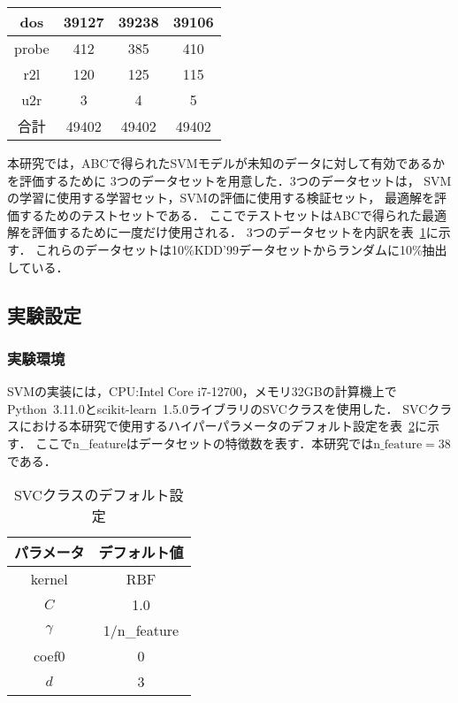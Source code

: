 \begin{table}[tb]
\begin{minipage}{0.45\textwidth}
\begin{tabular}{|c|c|c|c|}
          \hline  %
          dos & 39127 & 39238 & 39106 \\  %
          \hline  %
          probe & 412 & 385 & 410 \\  %
          \hline  %
          r2l & 120 & 125 & 115 \\  %
          \hline  %
          u2r & 3 & 4 & 5 \\  %
          \hline  %
          合計 & 49402 & 49402 & 49402 \\  %
          \hline  %
        \end{tabular}
        \label{3kdd99}  %
    \end{minipage}
  \end{table}
本研究では，ABCで得られたSVMモデルが未知のデータに対して有効であるかを評価するために
3つのデータセットを用意した\cite{origin}．3つのデータセットは，
SVMの学習に使用する学習セット，SVMの評価に使用する検証セット，
最適解を評価するためのテストセットである．
ここでテストセットはABCで得られた最適解を評価するために一度だけ使用される．
3つのデータセットを内訳を表~\ref{3kdd99}に示す．
これらのデータセットは10\%KDD'99データセットからランダムに10\%抽出している．
\subsection{実験設定}
\subsubsection{実験環境}
SVMの実装には，CPU:Intel Core i7-12700，メモリ32GBの計算機上で
Python~3.11.0とscikit-learn~1.5.0ライブラリのSVCクラスを使用した．
SVCクラスにおける本研究で使用するハイパーパラメータのデフォルト設定を表~\ref{default}に示す．
ここでn\_featureはデータセットの特徴数を表す．本研究では$\text{n\_feature}=38$である．
\begin{table}[tb]
    \centering
    \caption{SVCクラスのデフォルト設定}
    \begin{tabular}{|c|c|}  %
      \hline  %
      パラメータ & デフォルト値 \\  %
      \hline  %
      kernel & RBF\\  %
      \hline  %
      $C$ & 1.0 \\  %
      \hline  %
      $\gamma$ & 1/n\_feature\\  %
      \hline  %
      coef0 & 0\\  %
      \hline  %
      $d$ & 3\\  %
      \hline  %
  \end{tabular}
    \label{default}  %
  \end{table}

